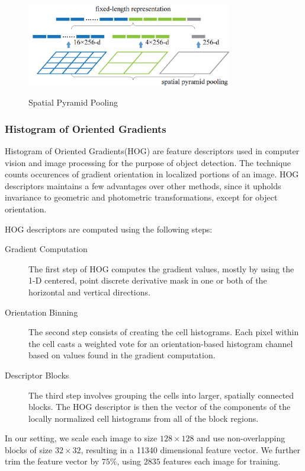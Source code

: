 \documentclass{article}
\begin{document}
\begin{figure}
\centering
\includegraphics[width=0.8\textwidth]{img/spp.png}
\label{fig:spp}
\caption{Spatial Pyramid Pooling}
\end{figure}

\subsubsection{Histogram of Oriented Gradients\cite{dalal2005histograms}}
Histogram of Oriented Gradients(HOG) are feature descriptors used in computer vision and image processing for the purpose of object detection. The technique counts occurences of gradient orientation in localized portions of an image. HOG descriptors maintains a few advantages over other methods, since it upholds invariance to geometric and photometric transformations, except for object orientation.\par
HOG descriptors are computed using the following steps:
\begin{description}
\item[Gradient Computation] The first step of HOG computes the gradient values, mostly by using the 1-D centered, point discrete derivative mask in one or both of the horizontal and vertical directions.
\item[Orientation Binning] The second step consists of creating the cell histograms. Each pixel within the cell casts a weighted vote for an orientation-based histogram channel based on values found in the gradient computation.
\item[Descriptor Blocks] The third step involves grouping the cells into larger, spatially connected blocks. The HOG descriptor is then the vector of the components of the locally normalized cell histograms from all of the block regions.
\end{description}
In our setting, we scale each image to size $128 \times 128$ and use non-overlapping blocks of size $32 \times 32$, resulting in a 11340 dimensional feature vector. We further trim the feature vector by $75\%$, using $2835$ features each image for training.
\end{document}
